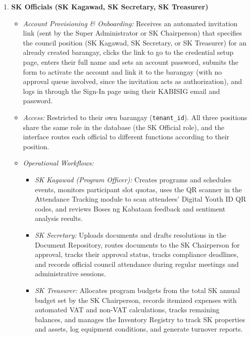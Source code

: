 \begin{enumerate}
    \item \textbf{SK Officials (SK Kagawad, SK Secretary, SK Treasurer)}
    \begin{itemize}
        \item \textit{Account Provisioning \& Onboarding:} Receives an automated invitation link (sent by the Super Administrator or SK Chairperson) that specifies the council position (SK Kagawad, SK Secretary, or SK Treasurer) for an already created barangay, clicks the link to go to the credential setup page, enters their full name and sets an account password, submits the form to activate the account and link it to the barangay (with no approval queue involved, since the invitation acts as authorization), and logs in through the Sign-In page using their KABISIG email and password.
        \item \textit{Access:} Restricted to their own barangay (\texttt{tenant\_id}). All three positions share the same role in the database (the SK Official role), and the interface routes each official to different functions according to their position.
        \item \textit{Operational Workflows:}
        \begin{itemize}
            \item \textit{SK Kagawad (Program Officer):} Creates programs and schedules events, monitors participant slot quotas, uses the QR scanner in the Attendance Tracking module to scan attendees' Digital Youth ID QR codes, and reviews Boses ng Kabataan feedback and sentiment analysis results.
            \item \textit{SK Secretary:} Uploads documents and drafts resolutions in the Document Repository, routes documents to the SK Chairperson for approval, tracks their approval status, tracks compliance deadlines, and records official council attendance during regular meetings and administrative sessions.
            \item \textit{SK Treasurer:} Allocates program budgets from the total SK annual budget set by the SK Chairperson, records itemized expenses with automated VAT and non-VAT calculations, tracks remaining balances, and manages the Inventory Registry to track SK properties and assets, log equipment conditions, and generate turnover reports.
        \end{itemize}
    \end{itemize}


\end{enumerate}
